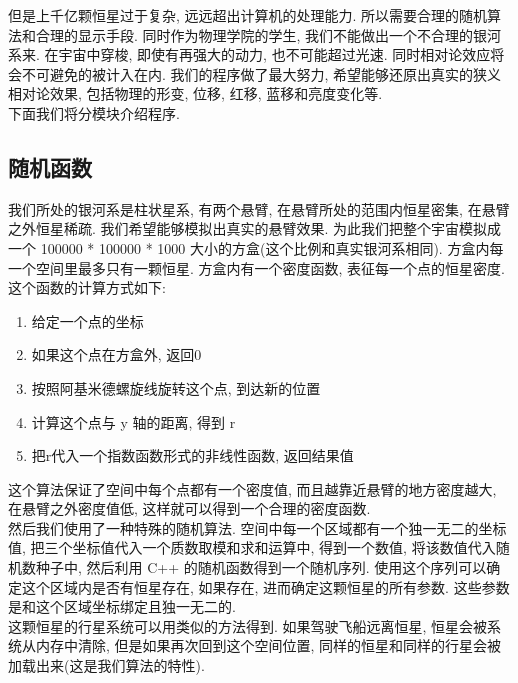 \documentclass[a4paper,12pt,titlepage]{article}
\begin{document}
	但是上千亿颗恒星过于复杂, 远远超出计算机的处理能力. 所以需要合理的随机算法和合理的显示手段. 同时作为物理学院的学生, 我们不能做出一个不合理的银河系来. 在宇宙中穿梭, 即使有再强大的动力, 也不可能超过光速. 同时相对论效应将会不可避免的被计入在内. 我们的程序做了最大努力, 希望能够还原出真实的狭义相对论效果, 包括物理的形变, 位移, 红移, 蓝移和亮度变化等. \\
	
	下面我们将分模块介绍程序.
	
\subsection{随机函数}

	我们所处的银河系是柱状星系, 有两个悬臂, 在悬臂所处的范围内恒星密集, 在悬臂之外恒星稀疏. 我们希望能够模拟出真实的悬臂效果. 为此我们把整个宇宙模拟成一个 100000 * 100000 * 1000 大小的方盒(这个比例和真实银河系相同). 方盒内每一个空间里最多只有一颗恒星. 方盒内有一个密度函数, 表征每一个点的恒星密度. 这个函数的计算方式如下:
	
\begin{enumerate}
	\item 给定一个点的坐标
	\item 如果这个点在方盒外, 返回0
	\item 按照阿基米德螺旋线旋转这个点, 到达新的位置
	\item 计算这个点与 y 轴的距离, 得到 r
	\item 把r代入一个指数函数形式的非线性函数, 返回结果值
\end{enumerate}

	这个算法保证了空间中每个点都有一个密度值, 而且越靠近悬臂的地方密度越大, 在悬臂之外密度值低, 这样就可以得到一个合理的密度函数. \\
	
	然后我们使用了一种特殊的随机算法. 空间中每一个区域都有一个独一无二的坐标值, 把三个坐标值代入一个质数取模和求和运算中, 得到一个数值, 将该数值代入随机数种子中, 然后利用 C++ 的随机函数得到一个随机序列. 使用这个序列可以确定这个区域内是否有恒星存在, 如果存在, 进而确定这颗恒星的所有参数. 这些参数是和这个区域坐标绑定且独一无二的. \\
	
	这颗恒星的行星系统可以用类似的方法得到. 如果驾驶飞船远离恒星, 恒星会被系统从内存中清除, 但是如果再次回到这个空间位置, 同样的恒星和同样的行星会被加载出来(这是我们算法的特性).
\end{document}
